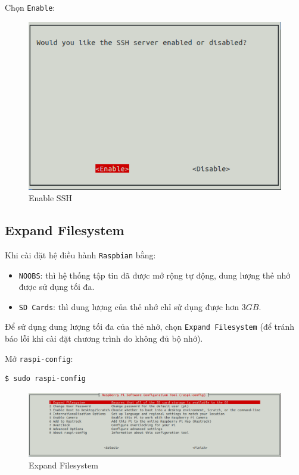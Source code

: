 \documentclass[12pt,a4paper]{article}
\begin{document}
\begin{list}{--}{}
		\item Chọn \verb|Enable|:
			\begin{figure}[!h]
				\begin{center}
					\includegraphics[scale=.3]{Enable-SSH.png}
				\end{center}
				\caption{Enable SSH}
			\end{figure}
	\end{list}
	
\subsection{Expand Filesystem}
	Khi cài đặt hệ điều hành \verb|Raspbian| bằng:
	
	\begin{itemize}
		\item \verb|NOOBS|: thì hệ thống tập tin đã được mở rộng tự động, dung lượng thẻ nhớ được sử dụng tối đa.
		
		\item \verb|SD Cards|: thì dung lượng của thẻ nhớ chỉ sử dụng được hơn $3GB$.
	\end{itemize}

	Để sử dụng dung lượng tối đa của thẻ nhớ, chọn \verb|Expand Filesystem| (để tránh báo lỗi khi cài đặt chương trình do không đủ bộ nhớ).

	\begin{list}{--}{}
		\item[] Mở \verb|raspi-config|:
			\begin{lstlisting}[language=bash]
$ sudo raspi-config
			\end{lstlisting}

			\begin{figure}[!h]
				\begin{center}
					\includegraphics[scale=.3]{Expand-Filesystem.png}
				\end{center}
				\caption{Expand Filesystem}
			\end{figure}
	\end{list}
	
\end{document}
